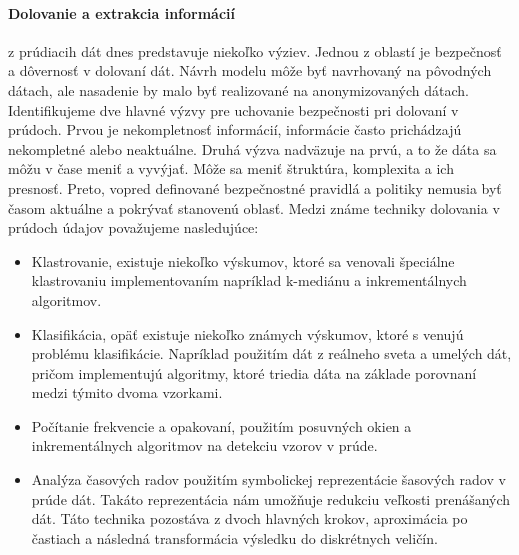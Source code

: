 \documentclass[11pt]{article}
\begin{document}
\paragraph{Dolovanie a extrakcia informácií} z prúdiacih dát dnes predstavuje niekoľko výziev. Jednou z oblastí je bezpečnosť a dôvernosť v dolovaní dát. Návrh modelu môže byť navrhovaný na pôvodných dátach, ale nasadenie by malo byť realizované na anonymizovaných dátach. Identifikujeme dve hlavné výzvy pre uchovanie bezpečnosti pri dolovaní v prúdoch. Prvou je nekompletnosť informácií, informácie často prichádzajú nekompletné alebo neaktuálne. Druhá výzva nadväzuje na prvú, a to že dáta sa môžu v čase meniť a vyvýjať. Môže sa meniť štruktúra, komplexita a ich presnosť. Preto, vopred definované bezpečnostné pravidlá a politiky nemusia byť časom aktuálne a pokrývať stanovenú oblasť. Medzi známe techniky dolovania v prúdoch údajov považujeme nasledujúce:
\\
\begin{itemize}
	\item Klastrovanie, existuje niekoľko výskumov, ktoré sa venovali špeciálne klastrovaniu implementovaním napríklad k-mediánu a inkrementálnych algoritmov.
	\item Klasifikácia, opäť existuje niekoľko známych výskumov, ktoré s venujú problému klasifikácie. Napríklad použitím dát z reálneho sveta a umelých dát, pričom implementujú algoritmy, ktoré triedia dáta na základe porovnaní medzi týmito dvoma vzorkami.
	\item Počítanie frekvencie a opakovaní, použitím posuvných okien a inkrementálnych algoritmov na detekciu vzorov v prúde.
	\item Analýza časových radov použitím symbolickej reprezentácie šasových radov v prúde dát. Takáto reprezentácia nám umožňuje redukciu veľkosti prenášaných dát. Táto technika pozostáva z dvoch hlavných krokov, aproximácia po častiach a následná transformácia výsledku do diskrétnych veličín.
\end{itemize}
\\
\end{document}
